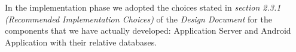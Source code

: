 In the implementation phase we adopted the choices stated in \textit{section 2.3.1 (Recommended Implementation Choices)} of the \textit{Design Document} for the components that we have actually developed: Application Server and Android Application with their relative databases.
